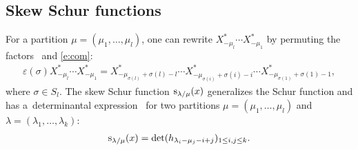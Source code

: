 \documentclass[10pt,a4paper]{amsart}
\numberwithin{equation}{section}
\begin{document}
\subsection{Skew Schur functions}
For a partition $\mu=(\mu_1,\dots,\mu_l)$, one can rewrite $X^*_{-\mu_l}\cdots X^*_{-\mu_1}$ by permuting the factors~\cite{Jing2000}
and \eqref{e:com}:
\begin{align}\label{e:sc5}
\varepsilon(\sigma)X^*_{-\mu_l}\cdots X^*_{-\mu_1}=X^*_{-\mu_{\sigma(l)}+\sigma(l)-l}\cdots X^*_{-\mu_{\sigma(i)}+\sigma(i)-i}\cdots X^*_{-\mu_{\sigma(1)}+\sigma(1)-1},
\end{align}
where $\sigma\in S_l$.
The skew Schur function ${\rm s}_{\lambda/\mu}(x)$ generalizes the Schur function and has a~determinantal expression~\cite[formula~(5.4)]{Mac1995} for two partitions $\mu=(\mu_1, \dots,\mu_l)$ and $\lambda=(\lambda_1, \dots,\lambda_k)$:
\begin{align*}
{\rm s}_{\lambda/\mu}(x)=\det(h_{\lambda_i-\mu_j-i+j})_{1\leq i,j\leq k}.
\end{align*}
\end{document}
